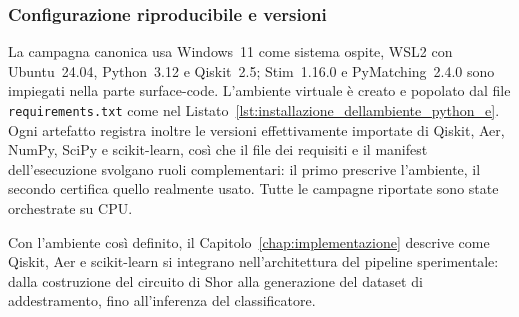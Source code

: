 \begin{onehalfspace}
\subsubsection{Configurazione riproducibile e versioni}
\label{app:ambiente_versioni}

La campagna canonica usa Windows~11 come sistema ospite, \ac{WSL}2 con Ubuntu~24.04,
Python~3.12 e Qiskit~2.5; Stim~1.16.0 e PyMatching~2.4.0 sono impiegati nella parte
surface-code. L'ambiente virtuale è creato e popolato dal file
\texttt{requirements.txt} come nel
Listato~\ref{lst:installazione_dellambiente_python_e}. Ogni artefatto registra inoltre
le versioni effettivamente importate di Qiskit, Aer, NumPy, SciPy e scikit-learn, così
che il file dei requisiti e il manifest dell'esecuzione svolgano ruoli complementari:
il primo prescrive l'ambiente, il secondo certifica quello realmente usato. Tutte le
campagne riportate sono state orchestrate su CPU.

Con l'ambiente così definito, il Capitolo~\ref{chap:implementazione} descrive come Qiskit, Aer e scikit-learn si integrano nell'architettura del pipeline sperimentale: dalla costruzione del circuito di Shor alla generazione del dataset di addestramento, fino all'inferenza del classificatore.

\end{onehalfspace}
